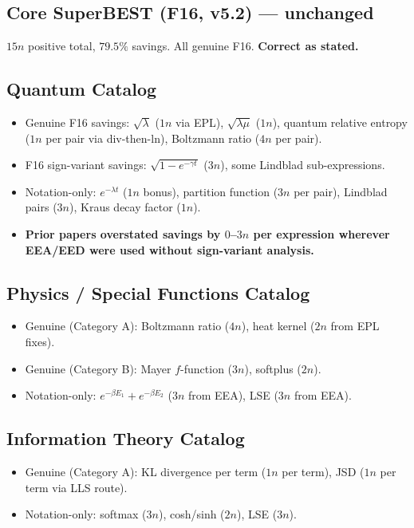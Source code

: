 \documentclass[11pt]{article}
\begin{document}
\subsection{Core SuperBEST (F16, v5.2) — unchanged}
$15n$ positive total, $79.5\%$ savings. All genuine F16. \textbf{Correct as stated.}

\subsection{Quantum Catalog}
\begin{itemize}
  \item Genuine F16 savings: $\sqrt{\lambda}$ ($1n$ via EPL), $\sqrt{\lambda\mu}$ ($1n$), quantum relative entropy ($1n$ per pair via div-then-ln), Boltzmann ratio ($4n$ per pair).
  \item F16 sign-variant savings: $\sqrt{1-e^{-\gamma t}}$ ($3n$), some Lindblad sub-expressions.
  \item Notation-only: $e^{-\lambda t}$ ($1n$ bonus), partition function ($3n$ per pair), Lindblad pairs ($3n$), Kraus decay factor ($1n$).
  \item \textbf{Prior papers overstated savings by $0$--$3n$ per expression wherever EEA/EED were used without sign-variant analysis.}
\end{itemize}

\subsection{Physics / Special Functions Catalog}
\begin{itemize}
  \item Genuine (Category A): Boltzmann ratio ($4n$), heat kernel ($2n$ from EPL fixes).
  \item Genuine (Category B): Mayer $f$-function ($3n$), softplus ($2n$).
  \item Notation-only: $e^{-\beta E_1}+e^{-\beta E_2}$ ($3n$ from EEA), LSE ($3n$ from EEA).
\end{itemize}

\subsection{Information Theory Catalog}
\begin{itemize}
  \item Genuine (Category A): KL divergence per term ($1n$ per term), JSD ($1n$ per term via LLS route).
  \item Notation-only: softmax ($3n$), cosh/sinh ($2n$), LSE ($3n$).
\end{itemize}
\end{document}

